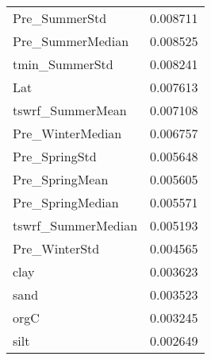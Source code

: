 \begin{tabular}{lr}
Pre_SummerStd & 0.008711 \\
Pre_SummerMedian & 0.008525 \\
tmin_SummerStd & 0.008241 \\
Lat & 0.007613 \\
tswrf_SummerMean & 0.007108 \\
Pre_WinterMedian & 0.006757 \\
Pre_SpringStd & 0.005648 \\
Pre_SpringMean & 0.005605 \\
Pre_SpringMedian & 0.005571 \\
tswrf_SummerMedian & 0.005193 \\
Pre_WinterStd & 0.004565 \\
clay & 0.003623 \\
sand & 0.003523 \\
orgC & 0.003245 \\
silt & 0.002649 \\
\bottomrule
\end{tabular}
